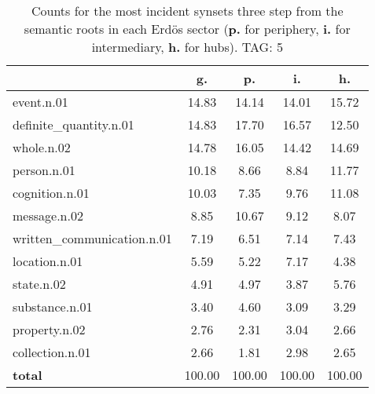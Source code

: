 \begin{table}[h!]
\begin{center}
\begin{tabular}{| l || c | c | c | c |}\hline
 & {\bf g.} & {\bf p.} & {\bf i.} & {\bf h.} \\\hline\hline
event.n.01 & 14.83  & 14.14  & 14.01  & 15.72 \\\hline
definite\_quantity.n.01 & 14.83  & 17.70  & 16.57  & 12.50 \\\hline
whole.n.02 & 14.78  & 16.05  & 14.42  & 14.69 \\\hline
person.n.01 & 10.18  & 8.66  & 8.84  & 11.77 \\\hline
cognition.n.01 & 10.03  & 7.35  & 9.76  & 11.08 \\\hline
message.n.02 & 8.85  & 10.67  & 9.12  & 8.07 \\\hline
written\_communication.n.01 & 7.19  & 6.51  & 7.14  & 7.43 \\\hline
location.n.01 & 5.59  & 5.22  & 7.17  & 4.38 \\\hline
state.n.02 & 4.91  & 4.97  & 3.87  & 5.76 \\\hline
substance.n.01 & 3.40  & 4.60  & 3.09  & 3.29 \\\hline
property.n.02 & 2.76  & 2.31  & 3.04  & 2.66 \\\hline
collection.n.01 & 2.66  & 1.81  & 2.98  & 2.65 \\\hline\hline
{{\bf total}} & 100.00  & 100.00  & 100.00  & 100.00 \\\hline
\end{tabular}
\caption{Counts for the most incident synsets three step from the semantic roots in each Erd\"os sector ({\bf p.} for periphery, {\bf i.} for intermediary, {\bf h.} for hubs). TAG: 5}
\end{center}
\end{table}